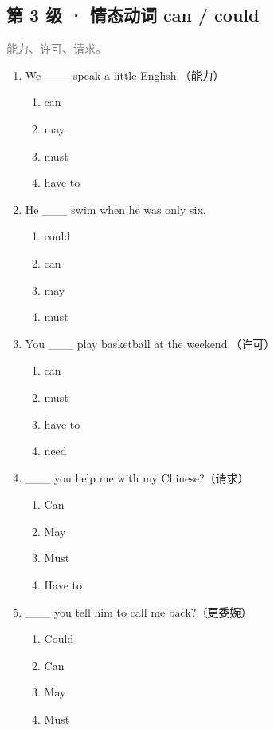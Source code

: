 \documentclass[11pt,a4paper]{ctexart}
\begin{document}
\subsection*{第 3 级 · 情态动词 can / could}
\noindent\textcolor{gray}{能力、许可、请求。}\par\smallskip
\begin{enumerate}[leftmargin=*,itemsep=4pt]
\item We \_\_\_ speak a little English.（能力）
\begin{enumerate}[label=\Alph*.,leftmargin=2em,itemsep=1pt,topsep=2pt]
\item can
\item may
\item must
\item have to
\end{enumerate}
\item He \_\_\_ swim when he was only six.
\begin{enumerate}[label=\Alph*.,leftmargin=2em,itemsep=1pt,topsep=2pt]
\item could
\item can
\item may
\item must
\end{enumerate}
\item You \_\_\_ play basketball at the weekend.（许可）
\begin{enumerate}[label=\Alph*.,leftmargin=2em,itemsep=1pt,topsep=2pt]
\item can
\item must
\item have to
\item need
\end{enumerate}
\item \_\_\_ you help me with my Chinese?（请求）
\begin{enumerate}[label=\Alph*.,leftmargin=2em,itemsep=1pt,topsep=2pt]
\item Can
\item May
\item Must
\item Have to
\end{enumerate}
\item \_\_\_ you tell him to call me back?（更委婉）
\begin{enumerate}[label=\Alph*.,leftmargin=2em,itemsep=1pt,topsep=2pt]
\item Could
\item Can
\item May
\item Must

\end{enumerate}
\end{enumerate}
\end{document}
